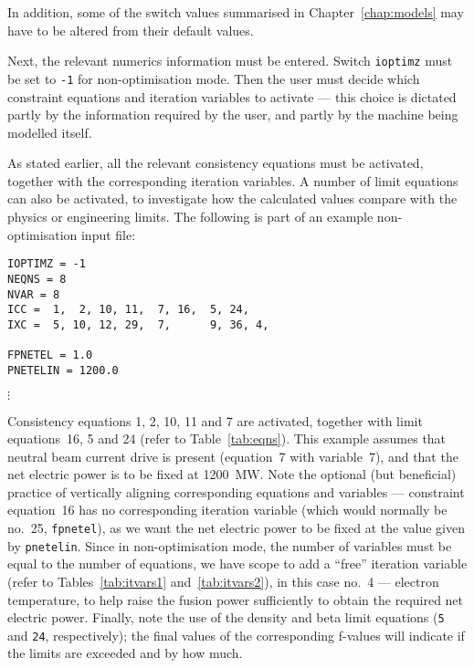 \documentclass[11pt,a4paper]{report}
\begin{document}
In addition, some of the switch values summarised in Chapter~\ref{chap:models}
may have to be altered from their default values.

Next, the relevant numerics information must be entered. Switch
\texttt{ioptimz} must be set to \texttt{-1} for non-optimisation mode. Then
the user must decide which constraint equations and iteration variables to
activate --- this choice is dictated partly by the information required by the
user, and partly by the machine being modelled itself.

As stated earlier, all the relevant consistency equations must be activated,
together with the corresponding iteration variables. A number of limit
equations can also be activated, to investigate how the calculated values
compare with the physics or engineering limits.  The following is part of an
example non-optimisation input file:
\begin{verbatim}
IOPTIMZ = -1
NEQNS = 8
NVAR = 8
ICC =  1,  2, 10, 11,  7, 16,  5, 24,
IXC =  5, 10, 12, 29,  7,      9, 36, 4,

FPNETEL = 1.0
PNETELIN = 1200.0
\end{verbatim}
\vspace{-6mm}
$\vdots$

Consistency equations 1, 2, 10, 11 and 7 are activated, together with limit
equations~16, 5 and 24 (refer to Table~\ref{tab:eqns}). This example assumes
that neutral beam current drive is present (equation~7 with variable~7), and
that the net electric power is to be fixed at 1200~MW\@. Note the optional
(but beneficial) practice of vertically aligning corresponding equations and
variables --- constraint equation~16 has no corresponding iteration variable
(which would normally be no.\ 25, \texttt{fpnetel}), as we want the net
electric power to be fixed at the value given by \texttt{pnetelin}. Since in
non-optimisation mode, the number of variables must be equal to the number of
equations, we have scope to add a ``free'' iteration variable (refer to
Tables~\ref{tab:itvars1} and~\ref{tab:itvars2}), in this case no.\ 4 ---
electron temperature, to help raise the fusion power sufficiently to obtain
the required net electric power. Finally, note the use of the density and beta
limit equations (\texttt{5} and \texttt{24}, respectively); the final values
of the corresponding f-values will indicate if the limits are exceeded and by
how much.
\end{document}
